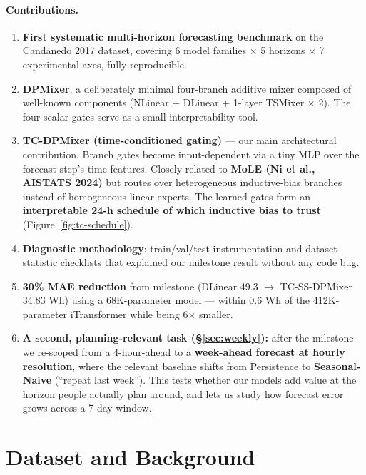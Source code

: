 \documentclass[11pt,letterpaper]{article}
\begin{document}
\paragraph{Contributions.}
\begin{enumerate}[leftmargin=*,itemsep=2pt]
  \item \textbf{First systematic multi-horizon forecasting benchmark} on the
        Candanedo 2017 dataset, covering 6 model families $\times$ 5
        horizons $\times$ 7 experimental axes, fully reproducible.
  \item \textbf{DPMixer}, a deliberately minimal four-branch additive mixer
        composed of well-known components (NLinear + DLinear + 1-layer
        TSMixer $\times$ 2). The four scalar gates serve as a small
        interpretability tool.
  \item \textbf{TC-DPMixer (time-conditioned gating)} --- our main
        architectural contribution. Branch gates become input-dependent via
        a tiny MLP over the forecast-step's time features. Closely related
        to \textbf{MoLE (Ni et al., AISTATS 2024)} but routes over
        heterogeneous inductive-bias branches instead of homogeneous linear
        experts. The learned gates form an \textbf{interpretable 24-h schedule
        of which inductive bias to trust} (Figure~\ref{fig:tc-schedule}).
  \item \textbf{Diagnostic methodology}: train/val/test instrumentation and
        dataset-statistic checklists that explained our milestone result
        without any code bug.
  \item \textbf{30\% MAE reduction} from milestone (DLinear 49.3 $\rightarrow$
        TC-SS-DPMixer 34.83 Wh) using a 68K-parameter model --- within
        0.6 Wh of the 412K-parameter iTransformer while being 6$\times$
        smaller.
  \item \textbf{A second, planning-relevant task (\S\ref{sec:weekly}):}
        after the milestone we re-scoped from a 4-hour-ahead to a
        \textbf{week-ahead forecast at hourly resolution}, where the
        relevant baseline shifts from Persistence to \textbf{Seasonal-Naive}
        (``repeat last week''). This tests whether our models add value at
        the horizon people actually plan around, and lets us study how
        forecast error grows across a 7-day window.
\end{enumerate}

\section{Dataset and Background}
\end{document}
